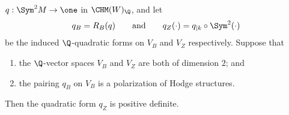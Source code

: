 \begin{theorem}
  \(q : \Sym^2 M \to \one\) in \(\CHM(W)_\Q\), and let
  \[q_B = R_B(q) \qquad \text{and} \qquad
    q_Z(\cdot) = q_{\vert{k}} \circ \Sym^2(\cdot)\]
  be the induced \(\Q\)-quadratic forms on \(V_B\) and \(V_Z\) respectively.
  Suppose that
  \begin{enumerate}
    \item the \(\Q\)-vector spaces \(V_B\) and \(V_Z\) are both of dimension
      \(2\); and
    \item the pairing \(q_B\) on \(V_B\) is a polarization of Hodge structures.
  \end{enumerate}
  Then the quadratic form \(q_Z\) is positive definite.
\end{theorem}

